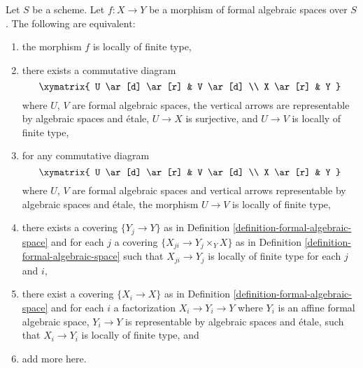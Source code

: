 \begin{lemma}
\label{lemma-finite-type-local}
Let $S$ be a scheme. Let $f : X \to Y$ be a morphism of formal algebraic
spaces over $S$. The following are equivalent:
\begin{enumerate}
\item the morphism $f$ is locally of finite type,
\item there exists a commutative diagram
$$
\xymatrix{
U \ar[d] \ar[r] & V \ar[d] \\
X \ar[r] & Y
}
$$
where $U$, $V$ are formal algebraic spaces, the vertical arrows are
representable by algebraic spaces and \'etale, $U \to X$
is surjective, and $U \to V$ is locally of finite type,
\item for any commutative diagram
$$
\xymatrix{
U \ar[d] \ar[r] & V \ar[d] \\
X \ar[r] & Y
}
$$
where $U$, $V$ are formal algebraic spaces and vertical arrows
representable by algebraic spaces and \'etale, the morphism
$U \to V$ is locally of finite type,
\item there exists a covering $\{Y_j \to Y\}$ as in
Definition \ref{definition-formal-algebraic-space}
and for each $j$ a covering $\{X_{ji} \to Y_j \times_Y X\}$ as in
Definition \ref{definition-formal-algebraic-space} such that
$X_{ji} \to Y_j$ is locally of finite type for each $j$ and $i$,
\item there exist a covering $\{X_i \to X\}$ as in
Definition \ref{definition-formal-algebraic-space}
and for each $i$ a factorization $X_i \to Y_i \to Y$ where $Y_i$
is an affine formal algebraic space, $Y_i \to Y$ is representable
by algebraic spaces and \'etale, such that $X_i \to Y_i$ is
locally of finite type, and
\item add more here.
\end{enumerate}
\end{lemma}

